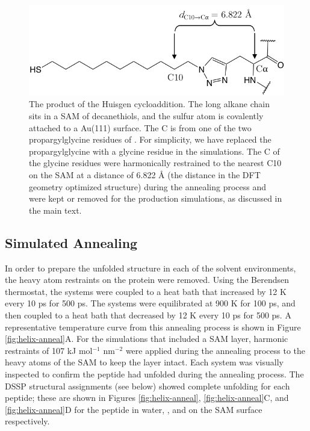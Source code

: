 \begin{figure}
    \center
    \includegraphics[width=6.00in]{figures-helix/Linker_figure.png}
    \caption{
        The product of the Huisgen cycloaddition. 
        The long alkane chain sits in a SAM of decanethiols, and the sulfur atom is covalently attached to a Au(111) surface. 
        The C\textalpha{} is from one of the two propargylglycine residues of \pep{}. 
        For simplicity, we have replaced the propargylglycine with a glycine residue in the simulations. 
        The C\textalpha{} of the glycine residues were harmonically restrained to the nearest C10 on the SAM at a distance of 6.822 \si{\angstrom} (the distance in the DFT geometry optimized structure) during the annealing process and were kept or removed for the production simulations, as discussed in the main text.
    }
    \label{fig:helix-linker}
\end{figure}

\subsection{Simulated Annealing}\label{helix-anneal}

In order to prepare the unfolded structure in each of the solvent environments, the heavy atom restraints on the protein were removed. 
Using the Berendsen thermostat, the systems were coupled to a heat bath that increased by 12 K every 10 ps for 500 ps. 
The systems were equilibrated at 900 K for 100 ps, and then coupled to a heat bath that decreased by 12 K every 10 ps for 500 ps. 
A representative temperature curve from this annealing process is shown in Figure \ref{fig:helix-anneal}A. 
For the simulations that included a SAM layer, harmonic restraints of 107 kJ mol$^{-1}$ nm$^{-2}$ were applied during the annealing process to the heavy atoms of the SAM to keep the layer intact. 
Each system was visually inspected to confirm the peptide had unfolded during the annealing process. 
The DSSP structural assignments (see below) showed complete unfolding for each peptide; 
these are shown in Figures \ref{fig:helix-anneal}, \ref{fig:helix-anneal}C, and \ref{fig:helix-anneal}D for the peptide in water, \tbawat{}, and on the SAM surface respectively.

